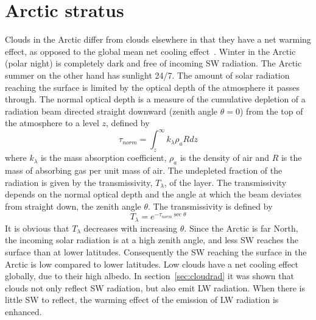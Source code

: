 
 

\section{Arctic stratus}
Clouds in the Arctic differ from clouds elsewhere in that they have a net warming effect, as opposed to the global mean net cooling effect~\citep{Shupe2004}. Winter in the Arctic (polar night) is completely dark and free of incoming SW radiation. The Arctic summer on the other hand has sunlight 24/7. The amount of solar radiation reaching the surface is limited by the optical depth of the atmosphere it passes through. The normal optical depth is a measure of the cumulative depletion of a radiation beam directed straight downward (zenith angle $\theta = 0$) from the top of the atmosphere to a level $z$, defined by~\citep{Wallace2006}
\begin{equation}
\tau_{norm} = \int_z^\infty k_{\lambda} \rho_a R dz
\end{equation}
where $k_{\lambda}$ is the mass absorption coefficient, $\rho_a$ is the density of air and $R$ is the mass of absorbing gas per unit mass of air.  The undepleted fraction of the radiation is given by the transmissivity, $T_{\lambda}$, of the layer. The transmissivity depends on the normal optical depth and the angle at which the beam deviates from straight down, the zenith angle $\theta$. The transmissivity is defined by~\citep{Wallace2006}
\begin{equation}
T_{\lambda} = e^{-\tau_{norm} \sec \theta}
\end{equation}
It is obvious that $T_{\lambda}$ decreases with increasing $\theta$. Since the Arctic is far North, the incoming solar radiation is at a high zenith angle, and less SW reaches the surface than at lower latitudes. Consequently the SW reaching the surface in the Arctic is low compared to lower latitudes. Low clouds have a net cooling effect globally, due to their high albedo. In section~\ref{sec:cloudrad} it was shown that clouds not only reflect SW radiation, but also emit LW radiation. When there is little SW to reflect, the warming effect of the emission of LW radiation is enhanced.



